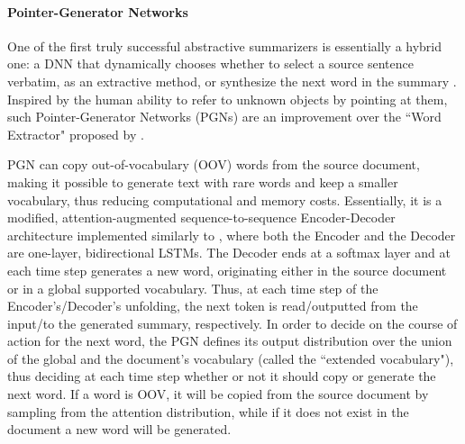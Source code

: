 \documentclass[preprint,review,10pt]{elsarticle}
\begin{document}
	\paragraph{Pointer-Generator Networks} One of the first truly successful abstractive summarizers is essentially a hybrid one: a DNN that dynamically chooses whether to select a source sentence verbatim, as an extractive method, or synthesize the next word in the summary \cite{abigail}. Inspired by the human ability to refer to unknown objects by pointing at them, such Pointer-Generator Networks (PGNs) are an improvement over the ``Word Extractor" proposed by \cite{lapata}.
	
	PGN can copy out-of-vocabulary (OOV) words from the source document, making it possible to generate text with rare words and keep a smaller vocabulary, thus reducing computational and memory costs. Essentially, it is a modified, attention-augmented sequence-to-sequence Encoder-Decoder architecture implemented similarly to \cite{nallapati}, where both the Encoder and the Decoder are one-layer, bidirectional LSTMs. The Decoder ends at a softmax layer and at each time step generates a new word, originating either in the source document or in a global supported vocabulary. Thus, at each time step of the Encoder's/Decoder's unfolding, the next token is read/outputted from the input/to the generated summary, respectively. In order to decide on the course of action for the next word, the PGN defines its output distribution over the union of the global and the document's vocabulary (called the ``extended vocabulary"), thus deciding at each time step whether or not it should copy or generate the next word. If a word is OOV, it will be copied from the source document by sampling from the attention distribution, while if it does not exist in the document a new word will be generated.
	
\end{document}
